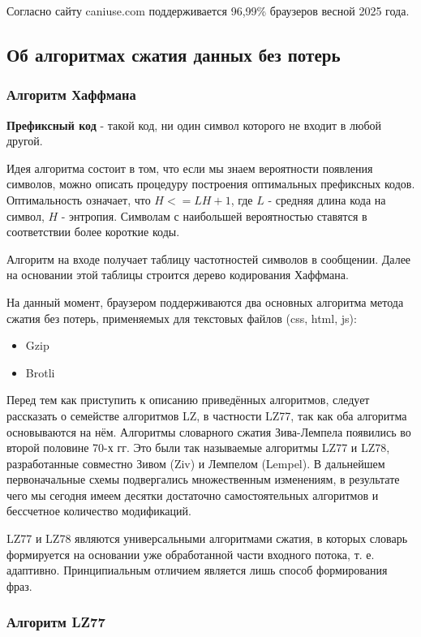 \documentclass[12pt]{article}
\begin{document}
Согласно сайту caniuse.com поддерживается 96,99\% браузеров весной 2025 года.

\subsection{Об алгоритмах сжатия данных без потерь}

\subsubsection{Алгоритм Хаффмана}

\textbf{Префиксный код} - такой код, ни один символ которого не входит в любой другой.

Идея алгоритма состоит в том, что если мы знаем вероятности появления символов,
можно описать процедуру построения оптимальных префиксных кодов. Оптимальность
означает, что $H <= L H + 1$, где $L$ - средняя длина кода на символ, $H$ - энтропия.
Символам с наибольшей вероятностью ставятся в соответствии более короткие коды.

Алгоритм на входе получает таблицу частотностей символов в сообщении.
Далее на основании этой таблицы строится дерево кодирования Хаффмана.

На данный момент, браузером поддерживаются два основных алгоритма метода сжатия без потерь, применяемых для текстовых файлов (css, html, js):

\begin{itemize}
    \item Gzip
    \item Brotli
\end{itemize}

Перед тем как приступить к описанию приведённых алгоритмов, следует рассказать
о семействе алгоритмов LZ, в частности LZ77, так как оба алгоритма основываются на нём.
Алгоритмы словарного сжатия Зива-Лемпела появились во второй половине 70-х гг.
Это были так называемые алгоритмы LZ77 и LZ78, разработанные совместно
Зивом (Ziv) и Лемпелом (Lempel). В дальнейшем первоначальные схемы подвергались множественным
изменениям, в результате чего мы сегодня имеем десятки достаточно самостоятельных алгоритмов
и бессчетное количество модификаций.

LZ77 и LZ78 являются универсальными алгоритмами сжатия,
в которых словарь формируется на основании уже обработанной части входного потока,
т. е. адаптивно. Принципиальным отличием является лишь способ формирования фраз.

\subsubsection{Алгоритм LZ77}
\end{document}
